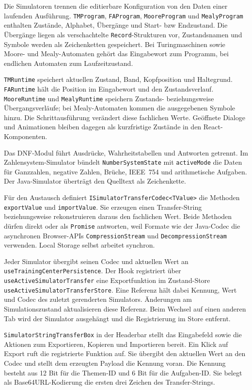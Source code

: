 
Die Simulatoren trennen die editierbare Konfiguration von den Daten einer laufenden Ausführung. \verb|TMProgram|, \verb|FAProgram|, \verb|MooreProgram| und \verb|MealyProgram| enthalten Zustände, Alphabet, Übergänge und Start- bzw Endzustand. Die Übergänge liegen als verschachtelte \verb|Record|-Strukturen vor, Zustandsnamen und Symbole werden als Zeichenketten gespeichert. Bei Turingmaschinen sowie Moore- und Mealy-Automaten gehört das Eingabewort zum Programm, bei endlichen Automaten zum Laufzeitzustand.

\verb|TMRuntime| speichert aktuellen Zustand, Band, Kopfposition und Haltegrund. \verb|FARuntime| hält die Position im Eingabewort und den Zustandsverlauf. \verb|MooreRuntime| und \verb|MealyRuntime| speichern Zustands- beziehungsweise Übergangsverläufe; bei Mealy-Automaten kommen die ausgegebenen Symbole hinzu. Die Schrittausführung verändert diese fachlichen Werte. Geöffnete Dialoge und Animationen bleiben dagegen als kurzfristige Zustände in den React-Komponenten.

Das DNF-Modul führt Ausdrücke, Wahrheitstabellen und Antworten getrennt. Im Zahlensystem-Simulator bündelt \verb|NumberSystemState| mit \verb|activeMode| die Daten für Ganzzahlen, negative Zahlen, Brüche, IEEE~754 und arithmetische Aufgaben. Der Java-Simulator überträgt den Quelltext als Zeichenkette.

Für den Austausch definiert \verb|ISimulatorTransferCodec<TValue>| die Methoden \verb|exportValue| und \verb|importValue|. Sie erzeugen einen Transfer-String beziehungsweise rekonstruieren daraus den fachlichen Wert. Beide Methoden dürfen direkt oder als \verb|Promise| antworten, weil Formate wie der Java-Codec die asynchronen Browser-APIs \verb|CompressionStream| und \verb|DecompressionStream| verwenden. Local Storage selbst arbeitet synchron.

Jeder Simulator übergibt seinen Codec und aktuellen Wert an \verb|useTrainingCenterPersistence|. Der Hook registriert über \verb|useActiveSimulatorTransfer| eine Exportfunktion im Zustand-Store \verb|useActiveSimulatorTransferStore|. Eine Referenz hält dabei Kennung, Wert und Codec des zuletzt gerenderten Simulators. Änderungen am Simulationszustand aktualisieren diese Referenz. Beim Wechsel auf einen anderen Tab wird der Simulator ausgehängt und die Registrierung im Store entfernt.

\verb|SimulatorStringTransferBox| in der Headerbar stellt das Eingabefeld sowie die Aktionen zum Exportieren, Kopieren und Importieren bereit. Ein Klick auf Export ruft die registrierte Funktion auf. Sie übergibt den aktuellen Wert an den Codec und stellt dem erzeugten Payload die Kennung voran. Die Kennung besteht aus 12 Bit für die Themen-ID und 6 Bit für die Aufgaben-ID. Sie belegt als Base64URL-Kodierung die ersten drei Zeichen des Transfer-Strings.

